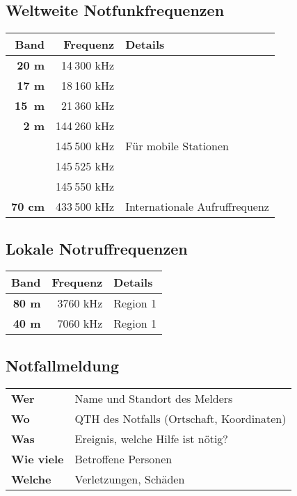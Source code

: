 \subsection{Weltweite Notfunkfrequenzen}

\begin{tabular}{r r l}
\bfseries Band & \bfseries Frequenz & \bfseries Details \\
\toprule \arrayrulecolor{rowsep}
\bfseries 20 m & 14 300 kHz &  \\ \midrule
\bfseries 17 m & 18 160 kHz &  \\ \midrule
\bfseries 15 m & 21 360 kHz &  \\ \midrule
\bfseries 2 m & 144 260 kHz &  \\ \midrule
 & 145 500 kHz & Für mobile Stationen \\ \midrule
 & 145 525 kHz &  \\ \midrule
 & 145 550 kHz &  \\ \midrule
\bfseries 70 cm & 433 500 kHz & Internationale Aufruffrequenz \\ \midrule
\end{tabular}

\subsection{Lokale Notruffrequenzen}
\begin{tabular}{r r l}
\bfseries Band & \bfseries Frequenz & \bfseries Details \\
\toprule \arrayrulecolor{rowsep}
\bfseries 80 m & 3760 kHz & Region 1 \\ \midrule
\bfseries 40 m & 7060 kHz & Region 1 \\ \midrule
\end{tabular}

\subsection{Notfallmeldung}

\noindent
\begin{tabular}{>{\bfseries} l l}
Wer & Name und Standort des Melders \\ 
Wo & QTH des Notfalls (Ortschaft, Koordinaten) \\ 
Was & Ereignis, welche Hilfe ist nötig? \\ 
Wie viele & Betroffene Personen \\ 
Welche & Verletzungen, Schäden
\end{tabular}

